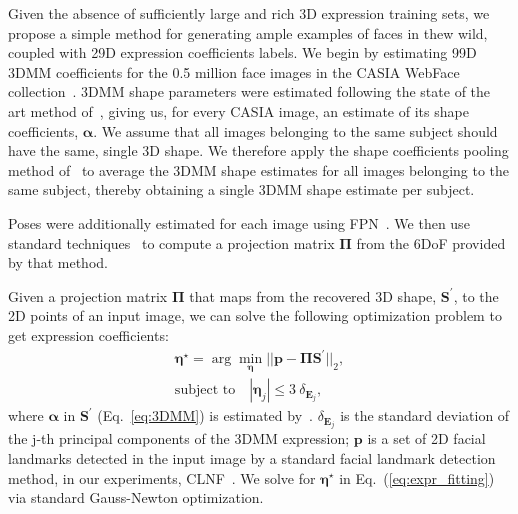 \documentclass[a4paper, 10pt, conference]{ieeeconf}
\def\mbf#1{\mathbf{#1}}
\begin{document}
Given the absence of sufficiently large and rich 3D expression training sets, we propose a simple method for generating ample examples of faces in thew wild, coupled with 29D expression coefficients labels. We begin by estimating 99D 3DMM coefficients for the 0.5 million face images in the CASIA WebFace collection~\cite{yi2014learning}. 3DMM shape parameters were estimated following the state of the art method of~\cite{tran16_3dmm_cnn}, giving us, for every CASIA image, an estimate of its shape coefficients, $\boldsymbol{\alpha}$. We assume that all images belonging to the same subject should have the same, single 3D shape. We therefore apply the shape coefficients pooling method of~\cite{tran16_3dmm_cnn} to average the 3DMM shape estimates for all images belonging to the same subject, thereby obtaining a single 3DMM shape estimate per subject. 

Poses were additionally estimated for each image using FPN~\cite{chang17fpn}. We then use standard techniques~\cite{hartley2003multiple} to compute a projection matrix $\boldsymbol{\Pi}$ from the 6DoF provided by that method.


Given a projection matrix $\boldsymbol{\Pi}$ that maps from the recovered 3D shape, $\mbf{S}^{\prime}$, to the 2D points of an input image, we can solve the following optimization problem to get expression coefficients:
\begin{equation}
\begin{split}
\boldsymbol{\eta}^{\star} = \arg\min_{\boldsymbol{\eta}} || \mbf{p} - \boldsymbol{\Pi} \mbf{S}^{\prime} ||_2, \\
\text{subject to} \quad |\boldsymbol{\eta}_j| \leq 3~{\delta}_{\mbf{E}_j},
\end{split}
\label{eq:expr_fitting}
\end{equation}
where $\boldsymbol{\alpha}$ in $\mbf{S}^{\prime}$ (Eq.~\ref{eq:3DMM}) is estimated by~\cite{tran16_3dmm_cnn}. ${\delta}_{\mbf{E}_j}$ is the standard deviation of the j-th principal components of the 3DMM expression; $\mbf{p}$ is a set of 2D facial landmarks detected in the input image by a standard facial landmark detection method, in our experiments, CLNF~\cite{baltrusaitis2013constrained}. We solve for $\boldsymbol{\eta}^{\star}$ in Eq.~(\ref{eq:expr_fitting}) via standard Gauss-Newton optimization.
\end{document}
